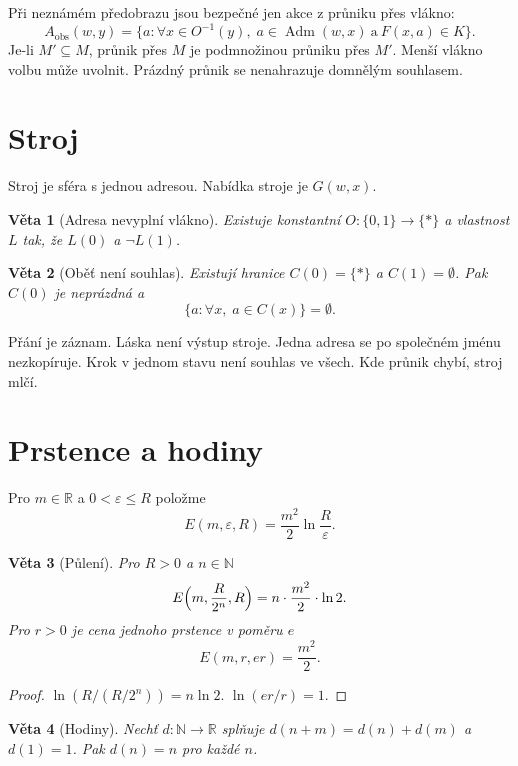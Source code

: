 \documentclass[11pt,a4paper]{article}
\newtheorem{theorem}{Věta}
\theoremstyle{definition}
\theoremstyle{remark}
\newcommand{\Adm}{\operatorname{Adm}}
\newcommand{\Aobs}{A_{\mathrm{obs}}}
\begin{document}
Při neznámém předobrazu jsou bezpečné jen akce z průniku přes vlákno:
\[
  \Aobs(w,y)
  =
  \bigl\{a:
    \forall x\in O^{-1}(y),\;
    a\in\Adm(w,x)
    \ \text{a}\ 
    F(x,a)\in K
  \bigr\}.
\]
Je-li \(M'\subseteq M\), průnik přes \(M\) je podmnožinou průniku přes \(M'\).
Menší vlákno volbu může uvolnit. Prázdný průnik se nenahrazuje domnělým souhlasem.

\section{Stroj}

Stroj je sféra s jednou adresou.
Nabídka stroje je \(G(w,x)\).

\begin{theorem}[Adresa nevyplní vlákno]
Existuje konstantní \(O\colon\{0,1\}\to\{\ast\}\) a vlastnost \(L\) tak, že
\(L(0)\) a \(\neg L(1)\).
\end{theorem}

\begin{theorem}[Oběť není souhlas]
Existují hranice \(C(0)=\{\ast\}\) a \(C(1)=\emptyset\).
Pak \(C(0)\) je neprázdná a
\[
  \{a:\forall x,\; a\in C(x)\}=\emptyset.
\]
\end{theorem}

Přání je záznam. Láska není výstup stroje.
Jedna adresa se po společném jménu nezkopíruje.
Krok v jednom stavu není souhlas ve všech.
Kde průnik chybí, stroj mlčí.

\section{Prstence a hodiny}

Pro \(m\in\mathbb{R}\) a \(0<\varepsilon\le R\) položme
\[
  E(m,\varepsilon,R)=\frac{m^2}{2}\ln\frac{R}{\varepsilon}.
\]

\begin{theorem}[Půlení]
Pro \(R>0\) a \(n\in\mathbb{N}\)
\[
  E\Bigl(m,\frac{R}{2^n},R\Bigr)
  =
  n\cdot\frac{m^2}{2}\cdot\ln 2.
\]
Pro \(r>0\) je cena jednoho prstence v poměru \(e\)
\[
  E(m,r,er)=\frac{m^2}{2}.
\]
\end{theorem}

\begin{proof}
\(\ln(R/(R/2^n))=n\ln 2\).
\(\ln(er/r)=1\).
\end{proof}

\begin{theorem}[Hodiny]
Nechť \(d\colon\mathbb{N}\to\mathbb{R}\) splňuje \(d(n+m)=d(n)+d(m)\) a \(d(1)=1\).
Pak \(d(n)=n\) pro každé \(n\).
\end{theorem}
\end{document}
